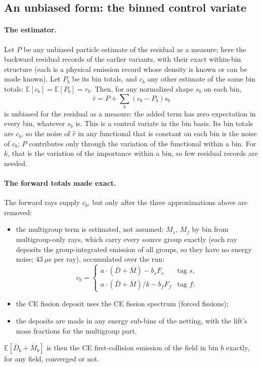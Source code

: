 \subsection{An unbiased form: the binned control variate}\label{sec:res:bcv}

\paragraph{The estimator.} Let $P$ be any unbiased particle estimate of the residual as a measure; here
the backward residual records of the earlier variants, with their exact within-bin structure (each is
a physical emission record whose density is known or can be made known). Let $P_b$ be its bin totals,
and $c_b$ any other estimate of the same bin totals: $\mathbb E[c_b]=\mathbb E[P_b]=r_b$. Then, for
any normalized shape $s_b$ on each bin,
\begin{equation}
\hat r=P+\sum_b\left(c_b-P_b\right)s_b
\end{equation}
is unbiased for the residual as a measure: the added term has zero expectation in every bin, whatever
$s_b$ is. This is a control variate in the bin basis. Its bin totals are $c_b$, so the noise of
$\hat r$ in any functional that is constant on each bin is the noise of $c_b$; $P$ contributes only
through the variation of the functional within a bin. For $k$, that is the variation of the importance
within a bin, so few residual records are needed.

\paragraph{The forward totals made exact.} The forward rays supply $c_b$, but only after the three
approximations above are removed:
\begin{itemize}
\item the multigroup term is estimated, not assumed: $M_s$, $M_f$ by bin from multigroup-only rays,
  which carry every source group exactly (each ray deposits the group-integrated emission of all
  groups, so they have no energy noise; $43~\mu$s per ray), accumulated over the run:
  \begin{equation}
  c_b=\begin{cases}a\cdot(\bar D+\bar M)-b_sF_s & \text{tag }s,\\ a\cdot(\bar D+\bar M)/k-b_fF_f & \text{tag }f;\end{cases}
  \end{equation}
\item the CE fission deposit uses the CE fission spectrum (forced fissions);
\item the deposits are made in any energy sub-bins of the netting, with the lift's mass fractions
  for the multigroup part.
\end{itemize}
$\mathbb E[\bar D_b+\bar M_b]$ is then the CE first-collision emission of the field in bin $b$
exactly, for any field, converged or not.

